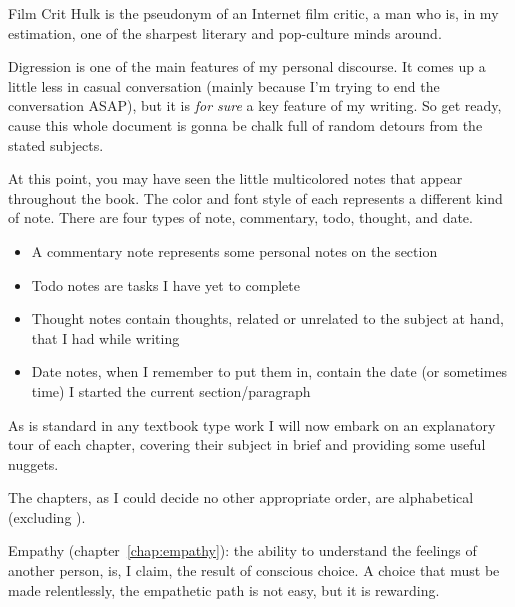 \documentclass[./butidigress.tex]{subfiles}
\begin{document}
Film Crit Hulk is the pseudonym of an Internet film critic, a man who is, in my estimation, one of the sharpest literary and pop-culture minds around.

\label{sec:thetitle}
Digression is one of the main features of my personal discourse.
It comes up a little less in casual conversation (mainly because I'm trying to end the conversation ASAP), but it is \emph{for sure} a key feature of my writing.
So get ready, cause this whole document is gonna be chalk full of random detours from the stated subjects.

At this point, you may have seen the little multicolored notes that appear throughout the book.
The color and font style of each represents a different kind of note.
There are four types of note, commentary, todo, thought, and date.

\begin{itemize}
    \item {\commstyle\textcolor{\commcolor}{A commentary note represents some personal notes on the section}}
    \item {\todostyle\textcolor{\todocolor}{Todo notes are tasks I have yet to complete}}
    \item {\thoughtstyle\textcolor{\thoughtcolor}{Thought notes contain thoughts, related or unrelated to the subject at hand, that I had while writing}}
    \item {\datestyle\textcolor{\datecolor}{Date notes, when I remember to put them in, contain the date (or sometimes time) I started the current section/paragraph}}
\end{itemize}

\label{sec:chapterrundown}
As is standard in any textbook type work I will now embark on an explanatory tour of each chapter, covering their subject in brief and providing some useful nuggets.

The chapters, as I could decide no other appropriate order, are alphabetical (excluding ).

Empathy (chapter~\ref{chap:empathy}): the ability to understand the feelings of another person, is, I claim, the result of conscious choice.
A choice that must be made relentlessly, the empathetic path is not easy, but it is rewarding.
\end{document}
